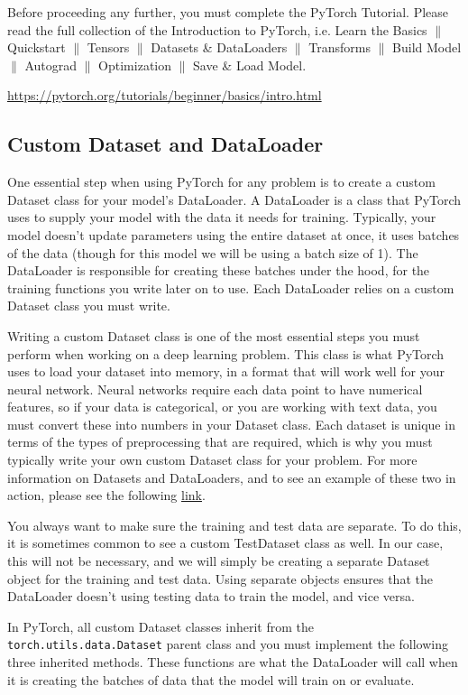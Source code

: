 \documentclass[11pt,addpoints,answers]{exam}
\begin{document}
Before proceeding any further, you must complete the PyTorch Tutorial. Please read the full collection of the Introduction to PyTorch, i.e. Learn the Basics $\|$ Quickstart $\|$ Tensors $\|$ Datasets \& DataLoaders $\|$ Transforms $\|$ Build Model $\|$ Autograd $\|$ Optimization $\|$ Save \& Load Model.    

    \url{https://pytorch.org/tutorials/beginner/basics/intro.html}
    
\subsection{Custom Dataset and DataLoader}\label{dataloader}
One essential step when using PyTorch for any problem is to create a custom Dataset class for your model's DataLoader. A DataLoader is a class that PyTorch uses to supply your model with the data it needs for training. Typically, your model doesn't update parameters using the entire dataset at once, it uses batches of the data (though for this model we will be using a batch size of 1). The DataLoader is responsible for creating these batches under the hood, for the training functions you write later on to use. Each DataLoader relies on a custom Dataset class you must write.

Writing a custom Dataset class is one of the most essential steps you must perform when working on a deep learning problem. This class is what PyTorch uses to load your dataset into memory, in a format that will work well for your neural network. Neural networks require each data point to have numerical features, so if your data is categorical, or you are working with text data, you must convert these into numbers in your Dataset class. Each dataset is unique in terms of the types of preprocessing that are required, which is why you must typically write your own custom Dataset class for your problem. For more information on Datasets and DataLoaders, and to see an example of these two in action, please see the following \href{https://pytorch.org/tutorials/beginner/basics/data_tutorial.html}{link}.

You always want to make sure the training and test data are separate. To do this, it is sometimes common to see a custom TestDataset class as well. In our case, this will not be necessary, and we will simply be creating a separate Dataset object for the training and test data. Using separate objects ensures that the DataLoader doesn't using testing data to train the model, and vice versa.

In PyTorch, all custom Dataset classes inherit from the \texttt{torch.utils.data.Dataset} parent class and you must implement the following three inherited methods. These functions are what the DataLoader will call when it is creating the batches of data that the model will train on or evaluate.
\end{document}
